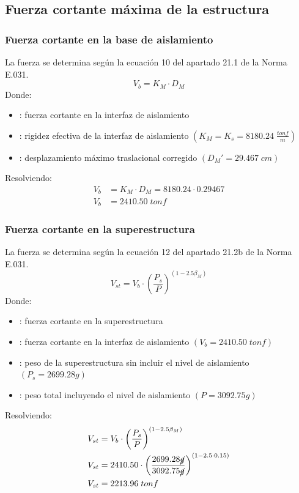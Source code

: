 \subsection{Fuerza cortante máxima de la estructura}

\subsubsection{Fuerza cortante en la base de aislamiento}
La fuerza se determina según la ecuación 10 del apartado 21.1 de la Norma E.031\supercite{E031.5}.
\begin{equation}
    V_b = K_M \cdot D_M \label{eq1_6}
\end{equation}
Donde:
\begin{itemize}
    \item{}: fuerza cortante en la interfaz de aislamiento
    \item{}: rigidez efectiva de la interfaz de aislamiento $\left( K_M = K_s = 8180.24 \; \frac{tonf}{m} \right)$
    \item{}: desplazamiento máximo traslacional corregido $(D_M' = 29.467 \; cm)$
\end{itemize}
Resolviendo:
\begin{align*}
    V_b &= K_M \cdot D_M = 8180.24 \cdot 0.29467 \\
    V_b &= 2410.50 \; tonf
\end{align*}

\subsubsection{Fuerza cortante en la superestructura}
La fuerza se determina según la ecuación 12 del apartado 21.2b de la Norma E.031\supercite{E031.6}.
\begin{equation}
    V_{st} = V_b \cdot \left( \dfrac{P_s}{P}\right)^ {(1 - 2.5 \beta_M)} \label{eq1_7}
\end{equation}
Donde:
\begin{itemize}
    \item{}: fuerza cortante en la superestructura
    \item{}: fuerza cortante en la interfaz de aislamiento $(V_b = 2410.50 \; tonf)$
    \item{}: peso de la superestructura sin incluir el nivel de aislamiento $(P_s = 2699.28g)$
    \item{}: peso total incluyendo el nivel de aislamiento $(P = 3092.75g)$
\end{itemize}
Resolviendo:
\begin{align*}
    V_{st} &= V_b \cdot \left( \dfrac{P_s}{P}\right)^ {(1 - 2.5 \beta_M)} \\ 
    V_{st} &= 2410.50 \cdot \left( \dfrac{2699.28\cancel{g}}{3092.75\cancel{g}}\right)^ {(1 - 2.5 \cdot 0.15)} \\
    V_{st} &= 2213.96 \; tonf 
\end{align*}

